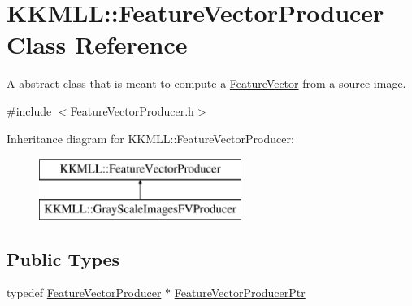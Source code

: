 \hypertarget{class_k_k_m_l_l_1_1_feature_vector_producer}{}\section{K\+K\+M\+LL\+:\+:Feature\+Vector\+Producer Class Reference}
\label{class_k_k_m_l_l_1_1_feature_vector_producer}


A abstract class that is meant to compute a \hyperlink{class_k_k_m_l_l_1_1_feature_vector}{Feature\+Vector} from a source image.  




{\ttfamily \#include $<$Feature\+Vector\+Producer.\+h$>$}

Inheritance diagram for K\+K\+M\+LL\+:\+:Feature\+Vector\+Producer\+:\begin{figure}[H]
\begin{center}
\leavevmode
\includegraphics[height=2.000000cm]{class_k_k_m_l_l_1_1_feature_vector_producer}
\end{center}
\end{figure}
\subsection*{Public Types}
\begin{DoxyCompactItemize}
\item 
typedef \hyperlink{class_k_k_m_l_l_1_1_feature_vector_producer}{Feature\+Vector\+Producer} $\ast$ \hyperlink{class_k_k_m_l_l_1_1_feature_vector_producer_a49978c16ff80ad688910f968c4cb466c}{Feature\+Vector\+Producer\+Ptr}
\end{DoxyCompactItemize}
